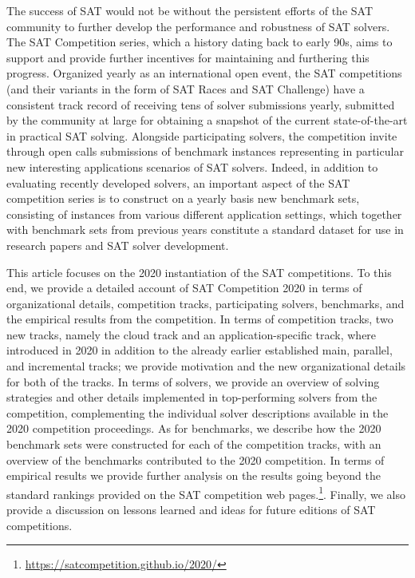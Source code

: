 \documentclass{elsarticle}
\begin{document}
The success of SAT would not be without the persistent efforts of the SAT community to further develop the performance and robustness
of SAT solvers. The SAT Competition series, which a history dating back to early 90s, aims to support and provide further incentives 
for maintaining and furthering this progress. Organized yearly as an international open event, the SAT competitions (and their variants
in the form of SAT Races and SAT Challenge) have a consistent track record of receiving tens of solver submissions yearly, submitted
by the community at large for obtaining a snapshot of the current state-of-the-art in practical SAT solving. Alongside participating solvers,
the competition invite through open calls submissions of benchmark instances representing in particular new interesting applications 
scenarios of SAT solvers. Indeed, in addition to evaluating recently developed solvers, an important aspect of the SAT competition series is
to construct on a yearly basis new benchmark sets, consisting of instances from various different application settings, which together with benchmark sets from previous years constitute a standard dataset for use in research papers and SAT solver development. 

This article focuses on the 2020 instantiation of the SAT competitions. 
To this end, we provide
a detailed account of SAT Competition 2020 in terms of organizational details, competition tracks,
participating solvers, benchmarks, and the empirical results from the competition.
In terms of competition tracks, two new tracks, namely the cloud track and an application-specific track, where introduced in 2020 
in addition to the already earlier established main, parallel, and incremental tracks; we
provide motivation and the new organizational details for both of the tracks.
In terms of solvers, we provide an overview of solving strategies and other details implemented in top-performing solvers
from the competition, complementing the individual solver descriptions available in the 2020 competition proceedings.
 As for benchmarks, we describe how the 2020 benchmark sets were constructed for each of the competition tracks, with 
an overview of the benchmarks contributed to the 2020 competition.
In terms of empirical results we provide further analysis on the results going beyond the standard rankings provided
on the SAT competition web pages.\footnote{\url{https://satcompetition.github.io/2020/}}. 
Finally, we also provide a discussion on lessons learned and ideas for future editions of SAT competitions.
\end{document}

